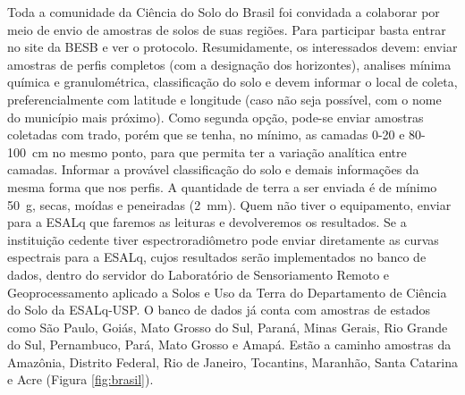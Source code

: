 Toda a comunidade da Ciência do Solo do Brasil foi convidada a colaborar por meio de envio de amostras de solos de suas regiões. Para participar basta entrar no site da BESB e ver o protocolo. Resumidamente, os interessados devem: enviar amostras de perfis completos (com a designação dos horizontes), analises mínima química e granulométrica, classificação do solo e devem informar o local de coleta, preferencialmente com latitude e longitude (caso não seja possível, com o nome do município mais próximo). Como segunda opção, pode-se enviar amostras coletadas com trado, porém que se tenha, no mínimo, as camadas 0-20 e 80-100~cm no mesmo ponto, para que permita ter a variação analítica entre camadas. Informar a provável classificação do solo e demais informações da mesma forma que nos perfis. A quantidade de terra a ser enviada é de mínimo 50~g, secas, moídas e peneiradas (2~mm). Quem não tiver o equipamento, enviar para a ESALq que faremos as leituras e devolveremos os resultados. Se a instituição cedente tiver espectroradiômetro pode enviar diretamente as curvas espectrais para a ESALq, cujos resultados serão implementados no banco de dados, dentro do servidor do Laboratório de Sensoriamento Remoto e Geoprocessamento aplicado a Solos e Uso da Terra do Departamento de Ciência do Solo da ESALq-USP. O banco de dados já conta com amostras de estados como São Paulo, Goiás, Mato Grosso do Sul, Paraná, Minas Gerais, Rio Grande do Sul, Pernambuco, Pará, Mato Grosso e Amapá. Estão a caminho amostras da Amazônia, Distrito Federal, Rio de Janeiro, Tocantins, Maranhão, Santa Catarina e Acre (Figura \ref{fig:brasil}).

